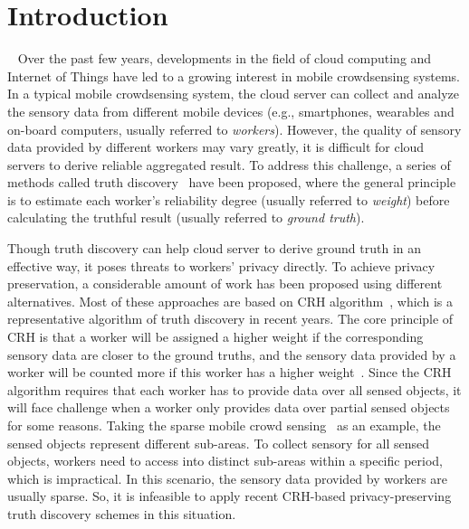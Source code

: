 \documentclass[conference]{IEEEtran}
\begin{document}
\section{Introduction}~\label{sec1}
Over the past few years, developments in the field of cloud computing and Internet of Things have led to a growing interest in mobile crowdsensing systems.
In a typical mobile crowdsensing system, the cloud server can collect and analyze the sensory data from different mobile devices (e.g., smartphones, wearables and on-board computers, usually referred to {\em workers}).
However, the quality of sensory data provided by different workers may vary greatly, it is difficult for cloud servers to derive reliable aggregated result.
To address this challenge, a series of methods called truth discovery~\cite{li_resolving_2014,li_confidence-aware_2014,li_conflicts_2016} have been proposed, where the general principle is to estimate each worker's reliability degree (usually referred to {\em weight}) before calculating the truthful result (usually referred to {\em ground truth}).

Though truth discovery can help cloud server to derive ground truth in an effective way, it poses threats to workers' privacy directly.
To achieve privacy preservation, a considerable amount of work has been proposed using different alternatives\cite{miao_cloud-enabled_2015,miao_lightweight_2017,xu_efficient_2019,zhang_reliable_2019,xue_inpptd_2020}.
Most of these approaches are based on CRH algorithm~\cite{li_resolving_2014}, which is a representative algorithm of truth discovery in recent years.
The core principle of CRH is that a worker will be assigned a higher weight if the corresponding sensory data are closer to the ground truths, and the sensory data provided by a worker will be counted more if this worker has a higher weight~\cite{xu_efficient_2019}.
Since the CRH algorithm requires that each worker has to provide data over all sensed objects, it will face challenge when a worker only provides data over partial sensed objects for some reasons.
Taking the sparse mobile crowd sensing~\cite{wang_sparse_2016} as an example, the sensed objects represent different sub-areas.
To collect sensory for all sensed objects, workers need to access into distinct sub-areas within a specific period, which is impractical.
In this scenario, the sensory data provided by workers are usually sparse.
So, it is infeasible to apply recent CRH-based privacy-preserving truth discovery schemes in this situation.
\end{document}
